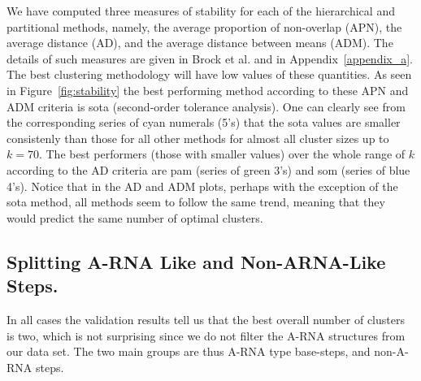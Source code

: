 We  have  computed  three  measures  of  stability  for  each  of  the
hierarchical and  partitional methods, namely,  the average proportion
of  non-overlap (APN),  the  average distance  (AD),  and the  average
distance between means (ADM).  The  details of such measures are given
in      Brock      et      al.       \cite{brock2008}      and      in
Appendix~\ref{appendix_a}. The  best clustering methodology  will have
low values of these quantities.  As seen in Figure~\ref{fig:stability}
the best performing method according  to these APN and ADM criteria is
sota (second-order  tolerance analysis). One can clearly  see from the
corresponding series of  cyan numerals (5's) that the  sota values are
smaller consistenly  than those for  all other methods for  almost all
cluster sizes up  to $k=70$.  The best performers  (those with smaller
values) over the  whole range of $k$ according to  the AD criteria are
pam (series of green 3's) and som (series of blue 4's). Notice that in
the AD  and ADM plots, perhaps  with the exception of  the sota method,
all methods  seem to  follow the same  trend, meaning that  they would
predict the same number of optimal clusters.

\subsection{Splitting  A-RNA Like  and Non-ARNA-Like  Steps.}   In all
cases the validation  results tell us that the  best overall number of
clusters is  two, which is not  surprising since we do  not filter the
A-RNA structures from our data set.  The two main groups are thus A-RNA
type base-steps, and non-A-RNA steps.


